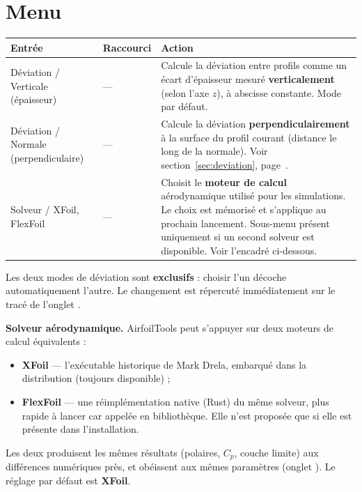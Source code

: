 \section{Menu }

\begin{tabularx}{\linewidth}{l l X}
    \toprule
    \textbf{Entrée} & \textbf{Raccourci} & \textbf{Action} \\
    \midrule
    Déviation / Verticale (épaisseur)
        & ---
        & Calcule la déviation entre profils comme un écart
          d'épaisseur mesuré \textbf{verticalement} (selon l'axe $z$),
          à abscisse constante. Mode par défaut.\\
    Déviation / Normale (perpendiculaire)
        & ---
        & Calcule la déviation \textbf{perpendiculairement} à la
          surface du profil courant (distance le long de la normale).
          Voir section~\ref{sec:deviation},
          page~\pageref{sec:deviation}.\\
    Solveur / XFoil, FlexFoil
        & ---
        & Choisit le \textbf{moteur de calcul} aérodynamique utilisé
          pour les simulations. Le choix est mémorisé et s'applique au
          prochain lancement. Sous-menu présent uniquement si un second
          solveur est disponible. Voir l'encadré ci-dessous.\\
    \bottomrule
\end{tabularx}

\begin{noteinfo}
Les deux modes de déviation sont \textbf{exclusifs} : choisir l'un
décoche automatiquement l'autre. Le changement est répercuté
immédiatement sur le tracé de l'onglet .
\end{noteinfo}

\begin{noteinfo}
\textbf{Solveur aérodynamique.} AirfoilTools peut s'appuyer sur deux
moteurs de calcul équivalents :
\begin{itemize}
    \item \textbf{XFoil} — l'exécutable historique de Mark Drela,
        embarqué dans la distribution (toujours disponible) ;
    \item \textbf{FlexFoil} — une réimplémentation native (Rust) du même
        solveur, plus rapide à lancer car appelée en bibliothèque. Elle
        n'est proposée que si elle est présente dans l'installation.
\end{itemize}
Les deux produisent les mêmes résultats (polaires, $C_p$, couche limite)
aux différences numériques près, et obéissent aux mêmes paramètres
(onglet ). Le réglage par défaut est
\textbf{XFoil}.
\end{noteinfo}

